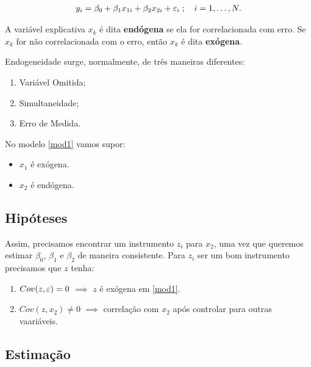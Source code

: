 \documentclass[11pt, oneside, a4paper, article]{article}
\numberwithin{equation}{section}
\begin{document}
\begin{description}
	\vspace{-1 em}
	\begin{align} \label{mod1}
		y_{i} = \beta_{0} + \beta_{1} x_{1i} + \beta_{2} x_{2i} + \varepsilon_{i}
		\; ; \quad i = 1, \dots, N.
	\end{align}

	\noindent
	A variável explicativa $x_{k}$ é dita \textbf{endógena} se ela for correlacionada com erro.
	Se $x_{k}$ for não correlacionada com o erro, então $x_{k}$ é dita \textbf{exógena}.

	Endogeneidade surge, normalmente, de três maneiras diferentes:

	\begin{enumerate}\itemsep0pt
		\item Variável Omitida;
		\item Simultaneidade;
		\item Erro de Medida.
	\end{enumerate}

	No modelo \eqref{mod1} vamos supor:

	\begin{itemize}\itemsep0pt
		\item $x_{1}$ é exógena.
		\item $x_{2}$ é endógena.
	\end{itemize}

	\subsection{Hipóteses}

	Assim, precisamos encontrar um instrumento $z_{i}$ para $x_{2}$, uma vez que queremos estimar $\beta_{0}$, $\beta_{1}$ e $\beta_{2}$ de maneira consistente.
	Para $z_{i}$ ser um bom instrumento precisamos que $z$ tenha:

	\begin{enumerate}\itemsep0pt
		\item $Cov(z, \varepsilon) = 0$ $\implies$  $z$ é exógena em \eqref{mod1}.
		\item $Cov(z, x_{2}) \neq 0$ $\implies$  correlação com $x_{2}$ após controlar para outras vaariáveis.
	\end{enumerate}

	\subsection{Estimação}


\end{description}
\end{document}

